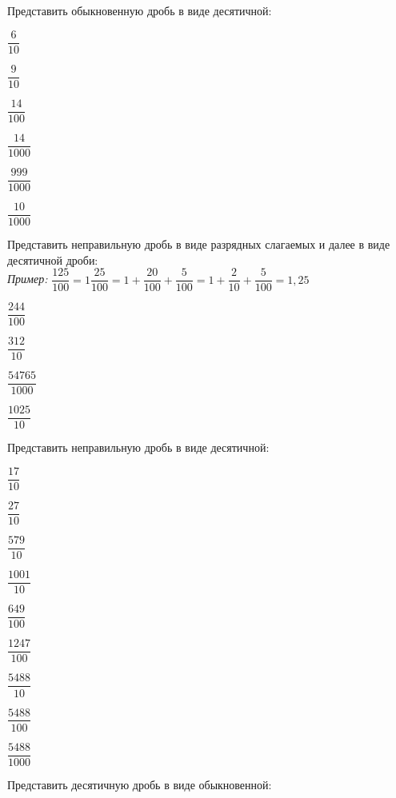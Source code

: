 %
%
%
%
\begin{class}[number=1]
	\begin{listofex}
		\item Представить обыкновенную дробь в виде десятичной:
		\begin{enumcols}[itemcolumns=6]
			\item \( \dfrac{6}{10} \)
			\item \( \dfrac{9}{10} \)
			\item \( \dfrac{14}{100} \)
			\item \( \dfrac{14}{1000} \)
			\item \( \dfrac{999}{1000} \)
			\item \( \dfrac{10}{1000} \)
		\end{enumcols}
		\item Представить неправильную дробь в виде разрядных слагаемых и далее в виде десятичной дроби:\\
		\textit{Пример:} \( \dfrac{125}{100}=1\dfrac{25}{100}=1+\dfrac{20}{100}+\dfrac{5}{100}=1+\dfrac{2}{10}+\dfrac{5}{100}=1,25 \)\\
		\begin{enumcols}[itemcolumns=4]
			\item \( \dfrac{244}{100} \)
			\item \( \dfrac{312}{10} \)
			\item \( \dfrac{54765}{1000} \)
			\item \( \dfrac{1025}{10} \)
		\end{enumcols}
		\item Представить неправильную дробь в виде десятичной:
		\begin{enumcols}[itemcolumns=5]
			\item \( \dfrac{17}{10} \)
			\item \( \dfrac{27}{10} \)
			\item \( \dfrac{579}{10} \)
			\item \( \dfrac{1001}{10} \)
			\item \( \dfrac{649}{100} \)
			\item \( \dfrac{1247}{100} \)
			\item \( \dfrac{5488}{10} \)
			\item \( \dfrac{5488}{100} \)
			\item \( \dfrac{5488}{1000} \)
		\end{enumcols}
		\item Представить десятичную дробь в виде обыкновенной:

\end{listofex}
\end{class}
